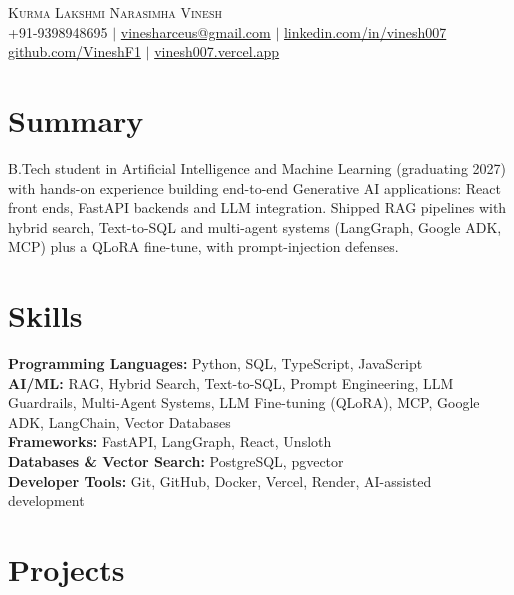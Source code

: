 \documentclass[letterpaper,11pt]{article}
\begin{document}
\begin{center}
{\fontsize{24}{26}\selectfont\scshape Kurma Lakshmi Narasimha Vinesh}\\[3pt]
+91-9398948695 \hspace{0.8em} $|$ \hspace{0.8em}
\href{mailto:vinesharceus@gmail.com}{vinesharceus@gmail.com} \hspace{0.8em} $|$ \hspace{0.8em}
\href{https://linkedin.com/in/vinesh007}{linkedin.com/in/vinesh007}\\[2pt]
\href{https://github.com/VineshF1}{github.com/VineshF1} \hspace{0.8em} $|$ \hspace{0.8em}
\href{https://vinesh007.vercel.app}{vinesh007.vercel.app}
\end{center}

\section*{Summary}
B.Tech student in Artificial Intelligence and Machine Learning (graduating 2027) with hands-on experience
building end-to-end Generative AI applications: React front ends, FastAPI backends and LLM integration.
Shipped RAG pipelines with hybrid search, Text\mbox{-}to\mbox{-}SQL and multi-agent systems (LangGraph, Google ADK,
MCP) plus a QLoRA fine-tune, with prompt-injection defenses.
\section*{Skills}
\textbf{Programming Languages:} Python, SQL, TypeScript, JavaScript \\
\textbf{AI/ML:} RAG, Hybrid Search, Text\mbox{-}to\mbox{-}SQL, Prompt Engineering, LLM Guardrails, Multi-Agent Systems, LLM Fine-tuning (QLoRA), MCP, Google ADK, LangChain, Vector Databases\\
\textbf{Frameworks:} FastAPI, LangGraph, React, Unsloth \\
\textbf{Databases \& Vector Search:} PostgreSQL, pgvector\\
\textbf{Developer Tools:} Git, GitHub, Docker, Vercel, Render, AI-assisted development

\section*{Projects}
\end{document}
